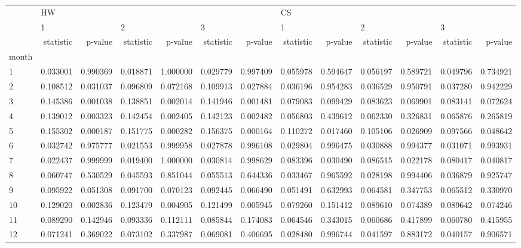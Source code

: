 \begin{tabular}{lrrrrrrrrrrrr}
\toprule
{} & \multicolumn{6}{l}{HW} & \multicolumn{6}{l}{CS} \\
{} & \multicolumn{2}{l}{1} & \multicolumn{2}{l}{2} & \multicolumn{2}{l}{3} & \multicolumn{2}{l}{1} & \multicolumn{2}{l}{2} & \multicolumn{2}{l}{3} \\
{} & statistic &   p-value & statistic &   p-value & statistic &   p-value & statistic &   p-value & statistic &   p-value & statistic &   p-value \\
month &           &           &           &           &           &           &           &           &           &           &           &           \\
\midrule
1     &  0.033001 &  0.990369 &  0.018871 &  1.000000 &  0.029779 &  0.997409 &  0.055978 &  0.594647 &  0.056197 &  0.589721 &  0.049796 &  0.734921 \\
2     &  0.108512 &  0.031037 &  0.096809 &  0.072168 &  0.109913 &  0.027884 &  0.036196 &  0.954283 &  0.036529 &  0.950791 &  0.037280 &  0.942229 \\
3     &  0.145386 &  0.001038 &  0.138851 &  0.002014 &  0.141946 &  0.001481 &  0.079083 &  0.099429 &  0.083623 &  0.069901 &  0.083141 &  0.072624 \\
4     &  0.139012 &  0.003323 &  0.142454 &  0.002405 &  0.142123 &  0.002482 &  0.056803 &  0.439612 &  0.062330 &  0.326831 &  0.065876 &  0.265819 \\
5     &  0.155302 &  0.000187 &  0.151775 &  0.000282 &  0.156375 &  0.000164 &  0.110272 &  0.017460 &  0.105106 &  0.026909 &  0.097566 &  0.048642 \\
6     &  0.032742 &  0.975777 &  0.021553 &  0.999958 &  0.027878 &  0.996108 &  0.029804 &  0.996475 &  0.030888 &  0.994377 &  0.031071 &  0.993931 \\
7     &  0.022437 &  0.999999 &  0.019400 &  1.000000 &  0.030814 &  0.998629 &  0.083396 &  0.030490 &  0.086515 &  0.022178 &  0.080417 &  0.040817 \\
8     &  0.060747 &  0.530529 &  0.045593 &  0.851044 &  0.055513 &  0.644336 &  0.033467 &  0.965592 &  0.028198 &  0.994406 &  0.036879 &  0.925747 \\
9     &  0.095922 &  0.051308 &  0.091700 &  0.070123 &  0.092445 &  0.066490 &  0.051491 &  0.632993 &  0.064581 &  0.347753 &  0.065512 &  0.330970 \\
10    &  0.129020 &  0.002836 &  0.123479 &  0.004905 &  0.121499 &  0.005945 &  0.079260 &  0.151412 &  0.089610 &  0.074389 &  0.089642 &  0.074246 \\
11    &  0.089290 &  0.142946 &  0.093336 &  0.112111 &  0.085844 &  0.174083 &  0.064546 &  0.343015 &  0.060686 &  0.417899 &  0.060780 &  0.415955 \\
12    &  0.071241 &  0.369022 &  0.073102 &  0.337987 &  0.069081 &  0.406695 &  0.028480 &  0.996744 &  0.041597 &  0.883172 &  0.040157 &  0.906571 \\
\bottomrule
\end{tabular}
